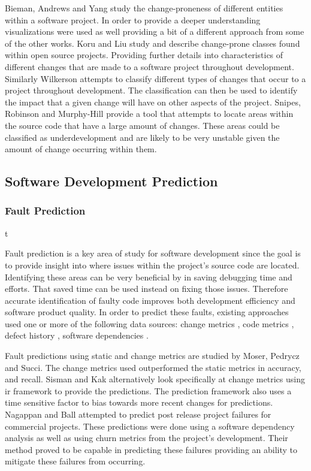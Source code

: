 Bieman, Andrews and Yang study the change-proneness of different entities within a software project\cite{Bieman2003a}. In order to provide a deeper understanding visualizations were used as well providing a bit of a different approach from some of the other works. Koru and Liu study and describe change-prone classes found within open source projects. Providing further details into characteristics of different changes that are made to a software project throughout development. Similarly Wilkerson attempts to classify different types of changes that occur to a project throughout development. The classification can then be used to identify the impact that a given change will have on other aspects of the project. Snipes, Robinson and Murphy-Hill provide a tool that attempts to locate areas within the source code that have a large amount of changes\cite{Snipes2011}. These areas could be classified as underdevelopment and are likely to be very unstable given the amount of change occurring within them.


\subsection{Software Development Prediction}

\subsubsection{Fault Prediction}t

Fault prediction is a key area of study for software development since the goal is to provide insight into where issues within the project's source code are located. Identifying these areas can be very beneficial by in saving debugging time and efforts. That saved time can be used instead on fixing those issues. Therefore accurate identification of faulty code improves both development efficiency and software product quality. In order to predict these faults, existing approaches used one or more of the following data sources: change metrics \cite{Moser2008, Sisman2012, Nagappan2007}, code metrics \cite{Moser2008, Thwin2005}, defect history \cite{Sisman2012}, software dependencies \cite{Nagappan2007}.

Fault predictions using static and change metrics are studied by Moser, Pedrycz and Succi\cite{Moser2008}. The change metrics used outperformed the static metrics in accuracy, and recall. Sisman and Kak alternatively look specifically at change metrics using \gls{ir} framework to provide the predictions. The prediction framework also uses a time sensitive factor to bias towards more recent changes for predictions. Nagappan and Ball attempted to predict post release project failures for commercial projects. These predictions were done using a software dependency analysis as well as using churn metrics from the project's development. Their method proved to be capable in predicting these failures providing an ability to mitigate these failures from occurring.

